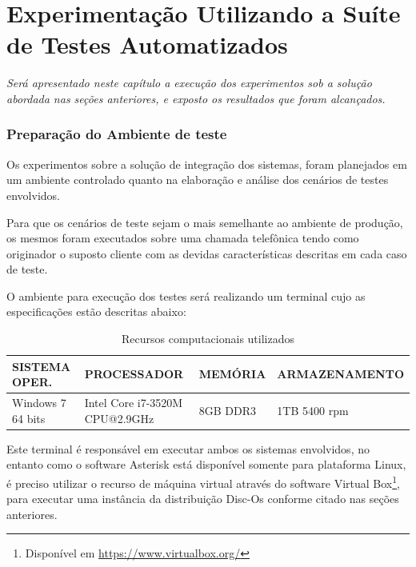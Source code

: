 \chapter[Experimentação Utilizando a Suíte de Testes Automatizados]{\textbf{E}xperimentação \textbf{U}tilizando a \textbf{S}uíte de \textbf{T}estes \textbf{A}utomatizados}

\textit{Será apresentado neste capítulo a execução dos experimentos sob a solução abordada nas seções anteriores, e exposto os resultados que foram alcançados.}


\subsection{Preparação do Ambiente de teste}

Os experimentos sobre a solução de integração dos sistemas, foram planejados em um ambiente controlado quanto na elaboração e análise dos cenários de testes envolvidos. 

Para que os cenários de teste sejam o mais semelhante ao ambiente de produção, os mesmos foram executados sobre uma chamada telefônica tendo como originador o suposto cliente com as devidas características descritas em cada caso de teste. 

O ambiente para execução dos testes será realizando um terminal cujo as especificações estão descritas abaixo:

\begin{table}[htb]
	\footnotesize
	\caption{Recursos computacionais utilizados}
	\label{tabela:recursosUtilizados}
	\begin{tabular}{|p{3.5cm}|p{3cm}|p{2cm}|p{4cm}|} \hline
		\textbf{SISTEMA OPER.} 	& \textbf{PROCESSADOR} 				& \textbf{MEMÓRIA} 	& \textbf{ARMAZENAMENTO}  \\ \hline
		Windows 7 64 bits 		& Intel Core i7-3520M CPU@2.9GHz 	& 8GB DDR3			& 1TB 5400 rpm \\ \hline
	\end{tabular}
\end{table}

Este terminal é responsável em executar ambos os sistemas envolvidos, no entanto como o software Asterisk está disponível somente para plataforma Linux, é preciso utilizar o recurso de máquina virtual através do software Virtual Box\footnote{Disponível em \url{https://www.virtualbox.org/}}, para executar uma instância da distribuição Disc-Os conforme citado nas seções anteriores.
 
